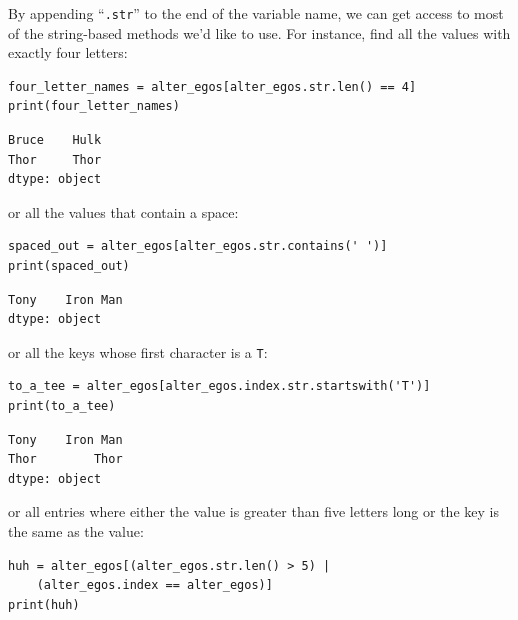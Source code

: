 By appending ``\texttt{.str}'' to the end of the variable name, we can get
access to most of the string-based methods we'd like to use. For instance, find
all the values with exactly four letters:

\begin{Verbatim}[fontsize=\small,samepage=true,frame=single,framesep=3mm]
four_letter_names = alter_egos[alter_egos.str.len() == 4]
print(four_letter_names)
\end{Verbatim}
\vspace{-.3in}

\begin{Verbatim}[fontsize=\small,samepage=true,frame=leftline,framesep=5mm,framerule=1mm]
Bruce    Hulk
Thor     Thor
dtype: object
\end{Verbatim}

or all the values that contain a space:

\begin{Verbatim}[fontsize=\small,samepage=true,frame=single,framesep=3mm]
spaced_out = alter_egos[alter_egos.str.contains(' ')]
print(spaced_out)
\end{Verbatim}
\vspace{-.3in}

\begin{Verbatim}[fontsize=\small,samepage=true,frame=leftline,framesep=5mm,framerule=1mm]
Tony    Iron Man
dtype: object
\end{Verbatim}

or all the keys whose first character is a \texttt{T}:

\begin{Verbatim}[fontsize=\footnotesize,samepage=true,frame=single,framesep=3mm]
to_a_tee = alter_egos[alter_egos.index.str.startswith('T')]
print(to_a_tee)
\end{Verbatim}
\vspace{-.3in}

\begin{Verbatim}[fontsize=\small,samepage=true,frame=leftline,framesep=5mm,framerule=1mm]
Tony    Iron Man
Thor        Thor
dtype: object
\end{Verbatim}

or all entries where either the value is greater than five letters long or the
key is the same as the value:

\begin{Verbatim}[fontsize=\small,samepage=true,frame=single,framesep=3mm]
huh = alter_egos[(alter_egos.str.len() > 5) |
    (alter_egos.index == alter_egos)]
print(huh)
\end{Verbatim}
\vspace{-.3in}

